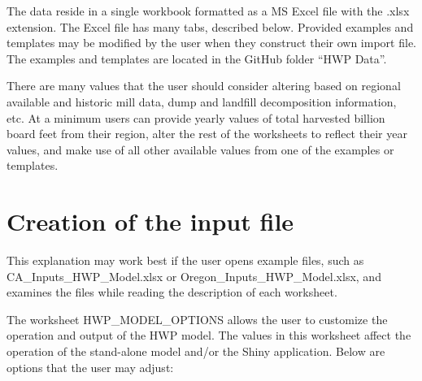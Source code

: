 \documentclass[
]{book}
\begin{document}
The data reside in a single workbook formatted as a MS Excel file with the .xlsx extension. The Excel file has many tabs, described below. Provided examples and templates may be modified by the user when they construct their own import file. The examples and templates are located in the GitHub folder ``HWP Data''.

There are many values that the user should consider altering based on regional available and historic mill data, dump and landfill decomposition information, etc. At a minimum users can provide yearly values of total harvested billion board feet from their region, alter the rest of the worksheets to reflect their year values, and make use of all other available values from one of the examples or templates.

\hypertarget{own-input}{%
\section{Creation of the input file}\label{own-input}}

This explanation may work best if the user opens example files, such as CA\_Inputs\_HWP\_Model.xlsx or Oregon\_Inputs\_HWP\_Model.xlsx, and examines the files while reading the description of each worksheet.

The worksheet HWP\_MODEL\_OPTIONS allows the user to customize the operation and output of the HWP model. The values in this worksheet affect the operation of the stand-alone model and/or the Shiny application. Below are options that the user may adjust:
\end{document}
